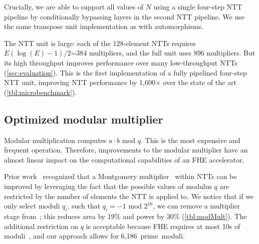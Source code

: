Crucially, we are able to support all values of $N$ using a single four-step NTT pipeline by conditionally bypassing layers in the second NTT pipeline.
We use the same transpose unit implementation as with automorphisms.

The NTT unit is large: each of the 128-element NTTs requires $E(\log (E)-1)/2$=384 multipliers,
and the full unit uses 896 multipliers.
But its high throughput improves performance over many low-throughput NTTs (\autoref{sec:evaluation}). %
This is the first implementation of a fully pipelined four-step NTT unit, 
improving NTT performance by 1,600$\times$ over the state of the art (\autoref{tbl:microbenchmark}).


\subsection{Optimized modular multiplier}\label{sec:modMult}
\tblModMult

Modular multiplication computes $a\cdot b \textrm{ mod } q$.
This is the most expensive and frequent operation.
Therefore, improvements to the modular multiplier have an almost
linear impact on the computational capabilities of an FHE accelerator.

Prior work~\cite{mert:euromicro19:design}
recognized that a Montgomery multiplier~\cite{montgomery:mom85:modular} within NTTs can be improved by leveraging
the fact that the possible values of modulus $q$ are restricted by the number of elements the NTT is applied to.
We notice that if we only select moduli $q_i$, such that $q_i = -1 \textrm{ mod } 2^{16}$,
we can remove a multiplier stage from~\cite{mert:euromicro19:design};
this reduces area by 19\% and power by 30\% (\autoref{tbl:modMult}).
The additional restriction on $q$ is acceptable because FHE
requires at most 10s of moduli~\cite{gentry:crypto2012:homomorphic},
and our approach allows for 6,186~prime~moduli.


